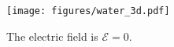 \documentclass{article}
\begin{document}
\begin{figure}
    \centering
    \texttt{[image: figures/water\_3d.pdf]}
    \caption{The electric field is $\mathcal{E}=0$.}
    \label{fig:water_3d}
\end{figure}     
\end{document}
